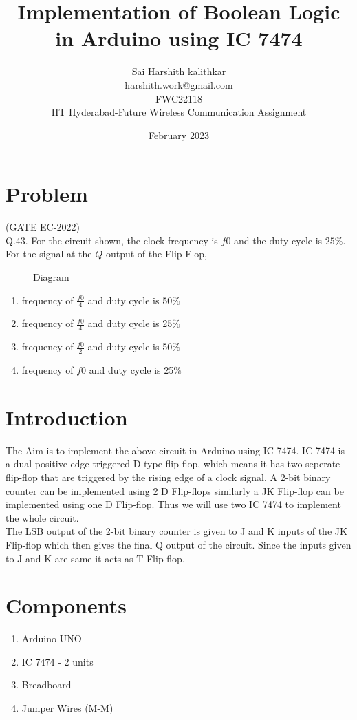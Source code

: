 \documentclass{article}
\title{Implementation of Boolean Logic in Arduino using IC 7474}
\date{February 2023}
\author{Sai Harshith kalithkar\\harshith.work@gmail.com\\FWC22118\\IIT Hyderabad-Future Wireless Communication Assignment}
\begin{document}
\maketitle
	\tableofcontents
\pagebreak
\section{Problem}
	(GATE EC-2022)\\
	Q.43. For the circuit shown, the clock frequency is $f0$ and the duty cycle is $25 \%$. For the signal at the $Q$ output of the Flip-Flop,
\\
\begin{figure}[h]

	\caption{Diagram}
	\label{fig:1}
\end{figure}

\begin{enumerate}
	\item frequency of $\frac{f0}{4}$ and duty cycle is 50$\%$
	\item frequency of $\frac{f0}{4}$ and duty cycle is 25$\%$
	\item frequency of $\frac{f0}{2}$ and duty cycle is 50$\%$
	\item frequency of $f0$ and duty cycle is 25$\%$ \\
\end{enumerate}

\section{Introduction}
		The Aim is to implement the above circuit in Arduino using IC 7474. IC 7474 is a dual positive-edge-triggered D-type flip-flop, which means it has two seperate flip-flop that are triggered by the rising edge of a clock signal. A 2-bit binary counter can be implemented using 2 D Flip-flops similarly a JK Flip-flop can be implemented using one D Flip-flop. Thus we will use two IC 7474 to implement the whole circuit.\\

		The LSB output of the 2-bit binary counter is given to J and K inputs of the JK Flip-flop which then gives the final Q output of the circuit. Since the inputs given to J and K are same it acts as T Flip-flop.\\
\section{Components}
	\begin{enumerate}
		\item Arduino UNO
		\item IC 7474 - 2 units
		\item Breadboard
		\item Jumper Wires (M-M) \\
	\end{enumerate}
\end{document}
